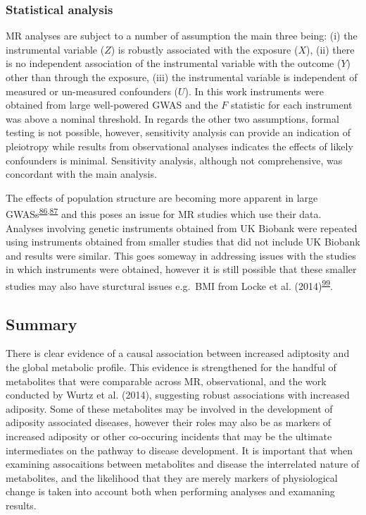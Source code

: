 \documentclass[11pt,twoside]{bristolthesis}
\begin{document}
\hypertarget{statistical-analysis-2}{%
\subsubsection{Statistical analysis}\label{statistical-analysis-2}}

MR analyses are subject to a number of assumption the main three being: (i) the instrumental variable (\(Z\)) is robustly associated with the exposure (\(X\)), (ii) there is no independent association of the instrumental variable with the outcome (\(Y\)) other than through the exposure, (iii) the instrumental variable is independent of measured or un-measured confounders (\(U\)). In this work instruments were obtained from large well-powered GWAS and the \(F\) statistic for each instrument was above a nominal threshold. In regards the other two assumptions, formal testing is not possible, however, sensitivity analysis can provide an indication of pleiotropy while results from observational analyses indicates the effects of likely confounders is minimal. Sensitivity analysis, although not comprehensive, was concordant with the main analysis.

The effects of population structure are becoming more apparent in large GWASs\textsuperscript{\protect\hyperlink{ref-Hartwig2018}{86},\protect\hyperlink{ref-Brumpton2019}{87}} and this poses an issue for MR studies which use their data. Analyses involving genetic instruments obtained from UK Biobank were repeated using instruments obtained from smaller studies that did not include UK Biobank and results were similar. This goes someway in addressing issues with the studies in which instruments were obtained, however it is still possible that these smaller studies may also have sturctural issues e.g.~BMI from Locke et al. (2014)\textsuperscript{\protect\hyperlink{ref-Sohail2019}{99}}.

\hypertarget{summary}{%
\subsection{Summary}\label{summary}}

There is clear evidence of a causal association between increased adiptosity and the global metabolic profile. This evidence is strengthened for the handful of metabolites that were comparable across MR, observational, and the work conducted by Wurtz et al. (2014), suggesting robust associations with increased adiposity. Some of these metabolites may be involved in the development of adiposity associated diseases, however their roles may also be as markers of increased adiposity or other co-occuring incidents that may be the ultimate intermediates on the pathway to disease development. It is important that when examining assocaitions between metabolites and disease the interrelated nature of metabolites, and the likelihood that they are merely markers of physiological change is taken into account both when performing analyses and examaning results.
\end{document}
